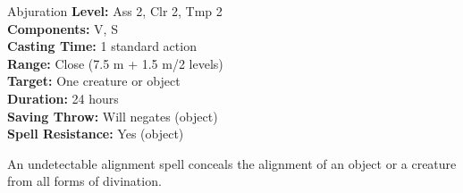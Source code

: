 {Abjuration}
{
	\textbf{Level:}
	Ass 2, Clr 2, Tmp 2\\
	\textbf{Components:}
	V, S\\
	\textbf{Casting Time:}
	1 standard action\\
	\textbf{Range:}
	Close (7.5 m + 1.5 m/2 levels)\\
	\textbf{Target:}
	One creature or object\\
	\textbf{Duration:}
	24 hours\\
	\textbf{Saving Throw:}
	Will negates (object)\\
	\textbf{Spell Resistance:}
	Yes (object)\\
}
{
	An undetectable alignment spell conceals the alignment of an object or a creature from all forms of divination.

}
